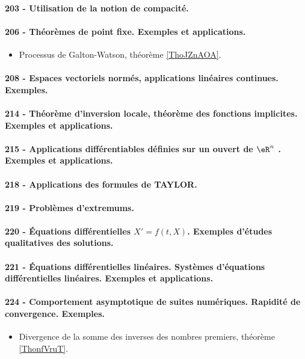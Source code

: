 \paragraph{203 - Utilisation de la notion de compacité.}
\paragraph{206 - Théorèmes de point fixe. Exemples et applications.}
\begin{itemize}
    \item Processus de Galton-Watson, théorème \ref{ThoJZnAOA}.
\end{itemize}
\paragraph{208 - Espaces vectoriels normés, applications linéaires continues. Exemples.}
\paragraph{214 - Théorème d’inversion locale, théorème des fonctions implicites. Exemples et applications.}
\paragraph{215 - Applications différentiables définies sur un ouvert de $\eR^n$ . Exemples et applications.}
\paragraph{218 - Applications des formules de TAYLOR.}
\paragraph{219 - Problèmes d’extremums.}
\paragraph{220 - Équations différentielles $X' = f (t , X )$. Exemples d’études qualitatives des solutions.}
\paragraph{221 - Équations différentielles linéaires. Systèmes d’équations différentielles linéaires. Exemples et applications.}
\paragraph{224 - Comportement asymptotique de suites numériques. Rapidité de convergence. Exemples.}
\begin{itemize}
    \item Divergence de la somme des inverses des nombres premiers, théorème \ref{ThonfVruT}.
\end{itemize}

